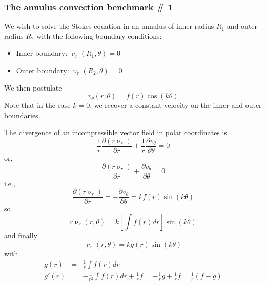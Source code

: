 

\subsubsection{The annulus convection benchmark \# 1} \label{ss:anconv}


We wish to solve the Stokes equation in an annulus of inner radius $R_1$
and outer radius $R_2$ with the following boundary conditions:
\begin{itemize}
\item Inner boundary: $\upnu_r(R_1,\theta)=0$ 
\item Outer boundary: $\upnu_r(R_2,\theta)=0$ 
\end{itemize}
We then postulate
\[
v_\theta(r,\theta)= f(r) \cos(k\theta)
\]
Note that in the case $k=0$, we recover a constant velocity on the inner and outer boundaries.

The divergence of an incompressible vector field in polar coordinates is
\[
\frac{1}{r} \frac{\partial (r\upnu_r)}{\partial r} + \frac{1}{r} \frac{\partial v_\theta}{\partial \theta} =0
\]
or, 
\[
\frac{\partial (r\upnu_r)}{\partial r} + \frac{\partial v_\theta}{\partial \theta} =0
\]
i.e.,
\[
\frac{\partial (r\upnu_r)}{\partial r} = - \frac{\partial v_\theta}{\partial \theta} = k f(r) \sin(k\theta) 
\]
so 
\[
r\upnu_r(r,\theta) = k \left[ \int f(r) dr \right] \sin(k\theta) 
\]
and finally 
\[
\upnu_r(r,\theta) = k g(r) \sin(k\theta)  
\]
with 
\begin{eqnarray}
g(r)  &=& \frac{1}{r} \int f(r) dr \\
g'(r) &=& -\frac{1}{r^2} \int f(r) dr + \frac{1}{r} f = - \frac{1}{r} g + \frac{1}{r} f = \frac{1}{r}(f-g) 
\end{eqnarray}



